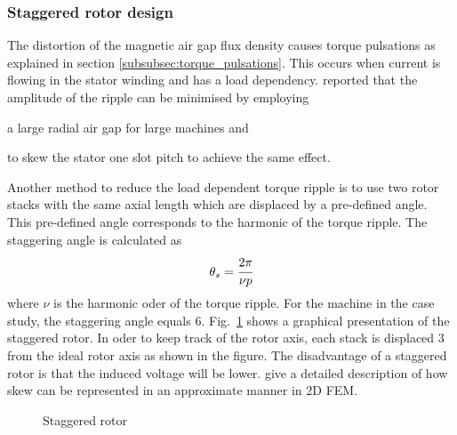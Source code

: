 \subsubsection{Staggered rotor design}\label{subsubsec:staggered_rotor}
The distortion of the magnetic air gap flux density causes torque pulsations as explained in section \ref{subsubsec:torque_pulsations}. This occurs when current is flowing in the stator winding and has a load dependency. \cite{Williamson1995} reported that the amplitude of the ripple can be minimised by employing
\begin{itemize*}
  \item a large radial air gap for large machines and
  \item to skew the stator one slot pitch to achieve the same effect.   
\end{itemize*}
Another method to reduce the load dependent torque ripple is to use two rotor stacks with the same axial length which are displaced by a pre-defined angle. This pre-defined angle corresponds to the harmonic of the torque ripple. The staggering angle is calculated as 
\begin{equation}
  \label{eqn:stagger_angle}
  \theta_s = \cfrac{2\pi}{\nu p}
\end{equation}   
where $\nu$ is the harmonic oder of the torque ripple. For the machine in the case study, the staggering angle equals \SI{6}{\arcdeg}. Fig.~\ref{fig:f_staggered} shows a graphical presentation of the staggered rotor. In oder to keep track of the rotor axis, each stack is displaced \SI{3}{\arcdeg} from the ideal rotor axis as shown in the figure. The disadvantage of a staggered rotor is that the induced voltage will be lower. \cite{Williamson1995a} give a detailed description of how skew can be represented in an approximate manner in 2D FEM.  
\begin{figure}
  \centering
  
  \caption{Staggered rotor}
  \label{fig:f_staggered}
\end{figure}
  

